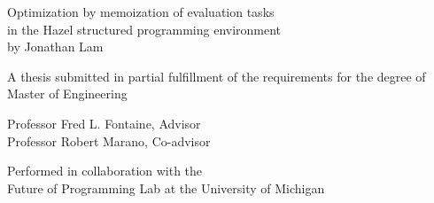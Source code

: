 \thispagestyle{empty}

{
  \centering
  \large

  
  \vfill{}
  
  {
    {
      \huge
      Optimization by memoization of evaluation tasks \\
      in the Hazel structured programming environment \\
    }
    \vs{}
    by Jonathan Lam \\
  }

  \vfill{}

  {
    A thesis submitted in partial fulfillment of the requirements for the degree of \\
    Master of Engineering \\
  }

  \vfill{}

  {
    Professor Fred L. Fontaine, Advisor \\
    Professor Robert Marano, Co-advisor \\
  }


  \vfill{}
  {
    Performed in collaboration with the \\
    Future of Programming Lab at the University of Michigan \\
  }
}

